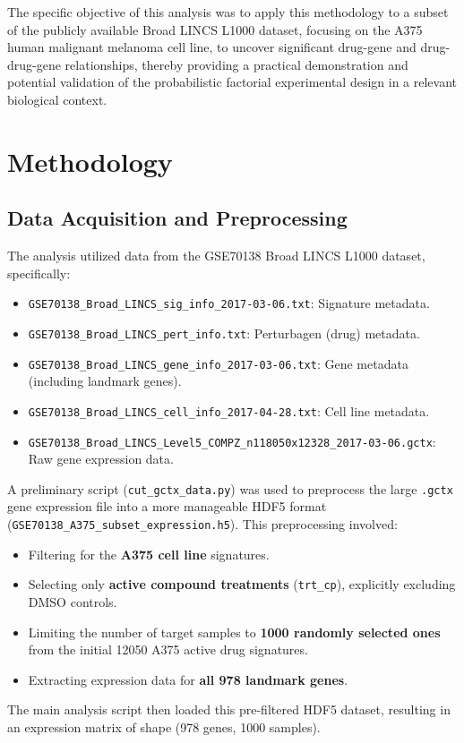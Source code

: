 \documentclass[12pt]{article}
\begin{document}
The specific objective of this analysis was to apply this methodology to a subset of the publicly available Broad LINCS L1000 dataset, focusing on the A375 human malignant melanoma cell line, to uncover significant drug-gene and drug-drug-gene relationships, thereby providing a practical demonstration and potential validation of the probabilistic factorial experimental design in a relevant biological context.

\section{Methodology}

\subsection{Data Acquisition and Preprocessing}

The analysis utilized data from the GSE70138 Broad LINCS L1000 dataset, specifically:
\begin{itemize}
    \item \texttt{GSE70138\_Broad\_LINCS\_sig\_info\_2017-03-06.txt}: Signature metadata.
    \item \texttt{GSE70138\_Broad\_LINCS\_pert\_info.txt}: Perturbagen (drug) metadata.
    \item \texttt{GSE70138\_Broad\_LINCS\_gene\_info\_2017-03-06.txt}: Gene metadata (including landmark genes).
    \item \texttt{GSE70138\_Broad\_LINCS\_cell\_info\_2017-04-28.txt}: Cell line metadata.
    \item \texttt{GSE70138\_Broad\_LINCS\_Level5\_COMPZ\_n118050x12328\_2017-03-06.gctx}: Raw gene expression data.
\end{itemize}

A preliminary script (\texttt{cut\_gctx\_data.py}) was used to preprocess the large \texttt{.gctx} gene expression file into a more manageable HDF5 format (\texttt{GSE70138\_A375\_subset\_expression.h5}). This preprocessing involved:
\begin{itemize}
    \item Filtering for the \textbf{A375 cell line} signatures.
    \item Selecting only \textbf{active compound treatments} (\texttt{trt\_cp}), explicitly excluding DMSO controls.
    \item Limiting the number of target samples to \textbf{1000 randomly selected ones} from the initial 12050 A375 active drug signatures.
    \item Extracting expression data for \textbf{all 978 landmark genes}.
\end{itemize}
The main analysis script then loaded this pre-filtered HDF5 dataset, resulting in an expression matrix of shape (978 genes, 1000 samples).
\end{document}
